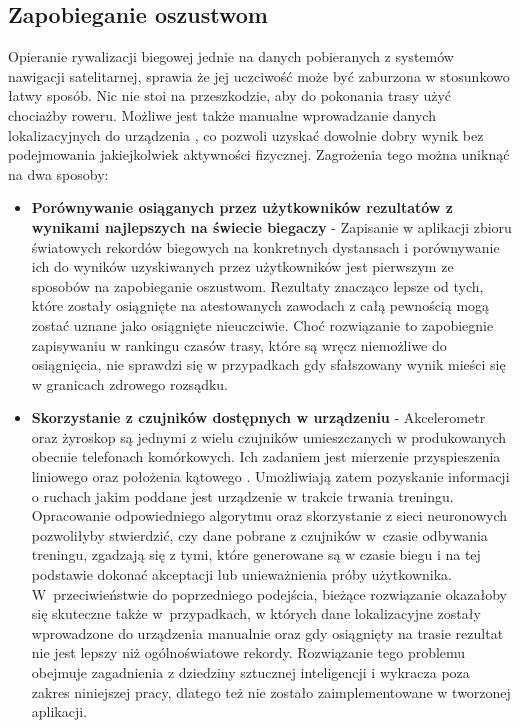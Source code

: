 \subsection{Zapobieganie oszustwom}\label{chap:zapobieganie-oszustwom}
Opieranie rywalizacji biegowej jednie na danych pobieranych z systemów nawigacji satelitarnej, sprawia że jej uczciwość może być zaburzona w stosunkowo łatwy sposób. Nic nie stoi na przeszkodzie, aby do pokonania trasy użyć chociażby roweru. Możliwe jest także manualne wprowadzanie danych lokalizacyjnych do urządzenia \cite{fakegps}, co pozwoli uzyskać dowolnie dobry wynik bez podejmowania jakiejkolwiek aktywności fizycznej. Zagrożenia tego można uniknąć na dwa sposoby:
\begin{itemize}
\item{\textbf{Porównywanie osiąganych przez użytkowników rezultatów z wynikami najlepszych na świecie biegaczy}} - Zapisanie w aplikacji zbioru światowych rekordów biegowych na konkretnych dystansach i porównywanie ich do wyników uzyskiwanych przez użytkowników jest pierwszym ze sposobów na zapobieganie oszustwom. Rezultaty znacząco lepsze od tych, które zostały osiągnięte na atestowanych zawodach z całą pewnością mogą zostać uznane jako osiągnięte nieuczciwie. Choć rozwiązanie to zapobiegnie zapisywaniu w rankingu czasów trasy, które są wręcz niemożliwe do osiągnięcia, nie sprawdzi się w przypadkach gdy sfałszowany wynik mieści się w granicach zdrowego rozsądku.
\item{\textbf{Skorzystanie z czujników dostępnych w urządzeniu}} - Akcelerometr oraz żyroskop są jednymi z wielu czujników umieszczanych w produkowanych obecnie telefonach komórkowych. Ich zadaniem jest mierzenie przyspieszenia liniowego oraz położenia kątowego \cite{czujniki}. Umożliwiają zatem pozyskanie informacji o ruchach jakim poddane jest urządzenie w trakcie trwania treningu. Opracowanie odpowiedniego algorytmu oraz skorzystanie z sieci neuronowych pozwoliłyby stwierdzić, czy dane pobrane z czujników w~czasie odbywania treningu, zgadzają się z tymi, które generowane są w czasie biegu i na tej podstawie dokonać akceptacji lub unieważnienia próby użytkownika. W~przeciwieństwie do poprzedniego podejścia, bieżące rozwiązanie okazałoby się skuteczne także w~przypadkach, w których dane lokalizacyjne zostały wprowadzone do urządzenia manualnie oraz gdy osiągnięty na trasie rezultat nie jest lepszy niż ogólnoświatowe rekordy. Rozwiązanie tego problemu obejmuje zagadnienia z dziedziny sztucznej inteligencji i wykracza poza zakres niniejszej pracy, dlatego też nie zostało zaimplementowane w tworzonej aplikacji.
\end{itemize}


